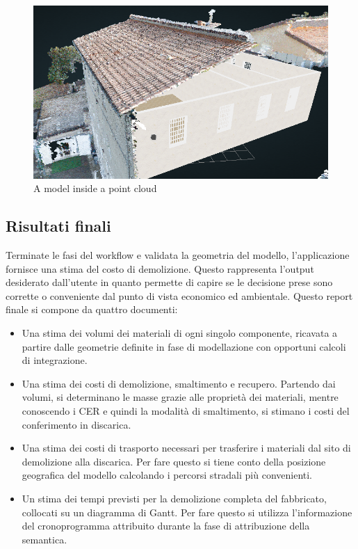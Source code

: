 \begin{figure}[htbp] %
   \centering
   \includegraphics[width=1\linewidth]{images/augmented}
   \caption{A model inside a point cloud}
   \label{fig:ui}
\end{figure}

\subsection{Risultati finali}

\noindent Terminate le fasi del workflow e validata la geometria del modello, l'applicazione fornisce una stima del costo di demolizione. Questo rappresenta l'output desiderato dall'utente in quanto permette di capire se le decisione prese sono corrette o conveniente dal punto di vista economico ed ambientale. Questo report finale si compone da quattro documenti:
\begin{itemize}
 \item Una stima dei volumi dei materiali di ogni singolo componente, ricavata a partire dalle geometrie definite in fase di modellazione con opportuni calcoli di integrazione.
 \item Una stima dei costi di demolizione, smaltimento e recupero. Partendo dai volumi, si determinano le masse grazie alle propriet\`a dei materiali, mentre conoscendo i CER e quindi la modalit\`a di smaltimento, si stimano i costi del conferimento in discarica.
 \item Una stima dei costi di trasporto necessari per trasferire i materiali dal sito di demolizione alla discarica. Per fare questo si tiene conto della posizione geografica del modello calcolando i percorsi stradali pi\`u convenienti.
 \item Un stima dei tempi previsti per la demolizione completa del fabbricato, collocati su un diagramma di Gantt. Per fare questo si utilizza l'informazione del cronoprogramma attribuito durante la fase di attribuzione della semantica.

\end{itemize}


\noindent